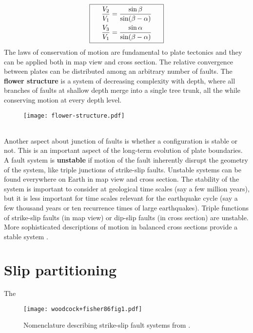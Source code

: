 \documentclass[letterpaper,12pt,]{memoir}
\begin{document}
\begin{equation}
\boxed{\begin{aligned}
\hspace{0.5cm}\frac{V_2}{V_1}&=\frac{\sin\beta}{\sin(\beta-\alpha)}\hspace{0.5cm}\\
\frac{V_3}{V_1}&=\frac{\sin\alpha}{\sin(\beta-\alpha)}
\end{aligned}}
\end{equation}
%
The laws of conservation of motion are fundamental to plate tectonics and they can be applied both in map view and cross section. The relative convergence between plates can be distributed among an arbitrary number of faults. The \textbf{flower structure} is a system of decreasing complexity with depth, where all branches of faults at shallow depth merge into a single tree trunk, all the while conserving motion at every depth level.\\
%
\begin{figure}
\texttt{[image: flower-structure.pdf]}
\end{figure}
%
\\
Another aspect about junction of faults is whether a configuration is stable or not. This is an important aspect of the long-term evolution of plate boundaries. A fault system is \textbf{unstable} if motion of the fault inherently disrupt the geometry of the system, like triple junctions of strike-slip faults. Unstable systems can be found everywhere on Earth in map view and cross section. The stability of the system is important to consider at geological time scales (say a few million years), but it is less important for time scales relevant for the earthquake cycle (say a few thousand years or ten recurrence times of large earthquakes). Triple functions of strike-slip faults (in map view) or dip-slip faults (in cross section) are unstable. More sophisticated descriptions of motion in balanced cross sections provide a stable system \citep{suppe81}.

\clearpage

\section{Slip partitioning}

The

\begin{sidewaysfigure}[p]
\texttt{[image: woodcock+fisher86fig1.pdf]}
\caption{Nomenclature describing strike-slip fault systems from \cite{woodcock&fischer86}.}
\label{fig:fluidity}
\end{sidewaysfigure}
\end{document}

